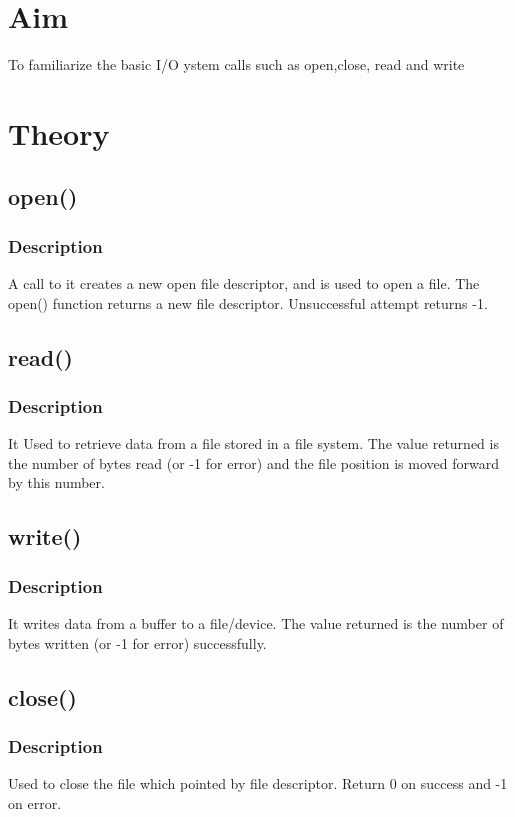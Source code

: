 
\section{Aim}
To familiarize the basic I/O ystem calls such as open,close, read and write

\section{Theory}

\subsection{open()}
\subsubsection{Description}
A call to it creates a new open file descriptor, and is used to open a file.
The open() function returns a new file descriptor. Unsuccessful attempt returns -1.

\subsection{read()}
\subsubsection{Description}
It Used to retrieve data from a file stored in a file system.
The value returned is the number of bytes read (or -1 for error)
and the file position is moved forward by this number.

\subsection{write()}
\subsubsection{Description}
It writes data from a buffer to a file/device. The value returned is
the number of bytes written (or -1 for error) successfully.

\subsection{close()}
\subsubsection{Description}
Used to close the file which pointed by file descriptor. Return 0 on success
and -1 on error.

